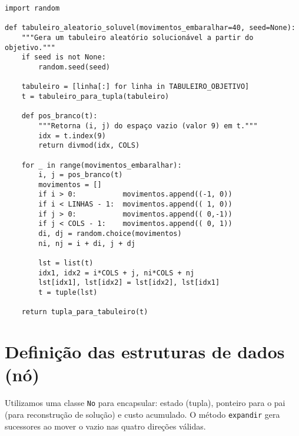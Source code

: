 \begin{verbatim}
import random

def tabuleiro_aleatorio_soluvel(movimentos_embaralhar=40, seed=None):
    """Gera um tabuleiro aleatório solucionável a partir do objetivo."""
    if seed is not None:
        random.seed(seed)

    tabuleiro = [linha[:] for linha in TABULEIRO_OBJETIVO]
    t = tabuleiro_para_tupla(tabuleiro)

    def pos_branco(t):
        """Retorna (i, j) do espaço vazio (valor 9) em t."""
        idx = t.index(9)
        return divmod(idx, COLS)

    for _ in range(movimentos_embaralhar):
        i, j = pos_branco(t)
        movimentos = []
        if i > 0:           movimentos.append((-1, 0))
        if i < LINHAS - 1:  movimentos.append(( 1, 0))
        if j > 0:           movimentos.append(( 0,-1))
        if j < COLS - 1:    movimentos.append(( 0, 1))
        di, dj = random.choice(movimentos)
        ni, nj = i + di, j + dj

        lst = list(t)
        idx1, idx2 = i*COLS + j, ni*COLS + nj
        lst[idx1], lst[idx2] = lst[idx2], lst[idx1]
        t = tuple(lst)

    return tupla_para_tabuleiro(t)
\end{verbatim}


\section{Definição das estruturas de dados (nó)}

Utilizamos uma classe \texttt{No} para encapsular: estado (tupla), ponteiro para o pai (para reconstrução de solução) e custo acumulado. O método \texttt{expandir} gera sucessores ao mover o vazio nas quatro direções válidas.

